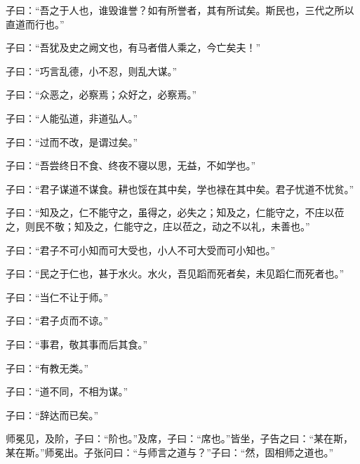 \documentclass[12pt,a4paper]{ctexbook}
\begin{document}
子曰：“吾之于人也，谁毁谁誉？如有所誉者，其有所试矣。斯民也，三代之所以直道而行也。”\par
子曰：“吾犹及史之阙文也，有马者借人乘之，今亡矣夫！”\par
子曰：“巧言乱德，小不忍，则乱大谋。”\par
子曰：“众恶之，必察焉；众好之，必察焉。”\par
子曰：“人能弘道，非道弘人。”\par
子曰：“过而不改，是谓过矣。”\par
子曰：“吾尝终日不食、终夜不寝以思，无益，不如学也。”\par
子曰：“君子谋道不谋食。耕也馁在其中矣，学也禄在其中矣。君子忧道不忧贫。”\par
子曰：“知及之，仁不能守之，虽得之，必失之；知及之，仁能守之，不庄以莅之，则民不敬；知及之，仁能守之，庄以莅之，动之不以礼，未善也。”\par
子曰：“君子不可小知而可大受也，小人不可大受而可小知也。”\par
子曰：“民之于仁也，甚于水火。水火，吾见蹈而死者矣，未见蹈仁而死者也。”\par
子曰：“当仁不让于师。”\par
子曰：“君子贞而不谅。”\par
子曰：“事君，敬其事而后其食。”\par
子曰：“有教无类。”\par
子曰：“道不同，不相为谋。”\par
子曰：“辞达而已矣。”\par
师冕见，及阶，子曰：“阶也。”及席，子曰：“席也。”皆坐，子告之曰：“某在斯，某在斯。”师冕出。子张问曰：“与师言之道与？”子曰：“然，固相师之道也。”\par
\end{document}
